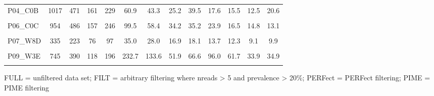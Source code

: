 \documentclass[
  10pt,
  letterpaper,
  DIV=11,
  numbers=noendperiod]{scrartcl}
\begin{document}
\begin{table}[H]
\begin{threeparttable}
\begin{tabular}[t]{lcccccccccccc}
P04\_C0B & 1017 & 471 & 161 & 229 & 60.9 & 43.3 & 25.2 & 39.5 & 17.6 & 15.5 & 12.5 & 20.6\\
\addlinespace
\cellcolor{gray!6}{P05\_W8C} & \cellcolor{gray!6}{616} & \cellcolor{gray!6}{296} & \cellcolor{gray!6}{90} & \cellcolor{gray!6}{131} & \cellcolor{gray!6}{157.5} & \cellcolor{gray!6}{76.6} & \cellcolor{gray!6}{34.2} & \cellcolor{gray!6}{35.1} & \cellcolor{gray!6}{41.8} & \cellcolor{gray!6}{20.7} & \cellcolor{gray!6}{15.3} & \cellcolor{gray!6}{11.5}\\
P06\_C0C & 954 & 486 & 157 & 246 & 99.5 & 58.4 & 34.2 & 35.2 & 23.9 & 16.5 & 14.8 & 13.1\\
\addlinespace
\cellcolor{gray!6}{P07\_W3D} & \cellcolor{gray!6}{867} & \cellcolor{gray!6}{492} & \cellcolor{gray!6}{147} & \cellcolor{gray!6}{205} & \cellcolor{gray!6}{160.4} & \cellcolor{gray!6}{102.9} & \cellcolor{gray!6}{46.3} & \cellcolor{gray!6}{48.0} & \cellcolor{gray!6}{56.2} & \cellcolor{gray!6}{42.8} & \cellcolor{gray!6}{27.2} & \cellcolor{gray!6}{22.5}\\
P07\_W8D & 335 & 223 & 76 & 97 & 35.0 & 28.0 & 16.9 & 18.1 & 13.7 & 12.3 & 9.1 & 9.9\\
\cellcolor{gray!6}{P08\_C0D} & \cellcolor{gray!6}{702} & \cellcolor{gray!6}{345} & \cellcolor{gray!6}{105} & \cellcolor{gray!6}{198} & \cellcolor{gray!6}{87.2} & \cellcolor{gray!6}{46.7} & \cellcolor{gray!6}{25.7} & \cellcolor{gray!6}{30.7} & \cellcolor{gray!6}{25.5} & \cellcolor{gray!6}{17.9} & \cellcolor{gray!6}{14.2} & \cellcolor{gray!6}{14.2}\\
\addlinespace
P09\_W3E & 745 & 390 & 118 & 196 & 232.7 & 133.6 & 51.9 & 66.6 & 96.0 & 61.7 & 33.9 & 34.9\\
\cellcolor{gray!6}{P10\_C0E} & \cellcolor{gray!6}{812} & \cellcolor{gray!6}{404} & \cellcolor{gray!6}{143} & \cellcolor{gray!6}{203} & \cellcolor{gray!6}{24.6} & \cellcolor{gray!6}{14.7} & \cellcolor{gray!6}{11.1} & \cellcolor{gray!6}{8.1} & \cellcolor{gray!6}{4.9} & \cellcolor{gray!6}{4.0} & \cellcolor{gray!6}{3.8} & \cellcolor{gray!6}{2.5}\\
\bottomrule
\end{tabular}
\begin{tablenotes}
\item FULL = unfiltered data set; FILT = arbitrary filtering where nreads > 5 and prevalence > 20\%; PERFect = PERFect filtering; PIME = PIME filtering
\end{tablenotes}
\end{threeparttable}
\end{table}
\end{document}
